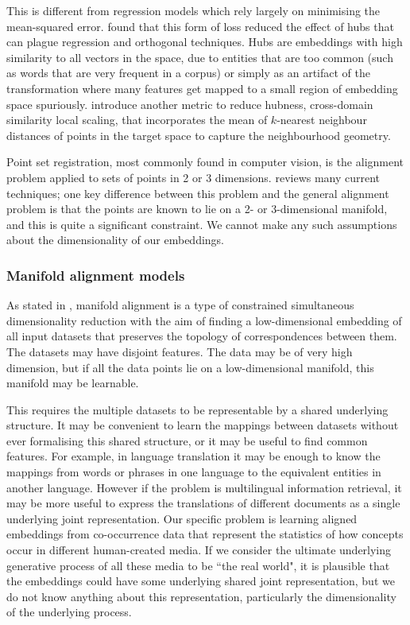 This is different from regression models which rely largely on minimising the mean-squared error. \cite{Hubness} found that this form of loss reduced the effect of hubs that can plague regression and orthogonal techniques. Hubs are embeddings with high similarity to all vectors in the space, due to entities that are too common (such as words that are very frequent in a corpus) or simply as an artifact of the transformation where many features get mapped to a small region of embedding space spuriously. \cite{ImprovingSupervisedBilingualMapping} introduce another metric to reduce hubness, cross-domain similarity local scaling, that incorporates the mean of $k$-nearest neighbour distances of points in the target space to capture the neighbourhood geometry. 

Point set registration, most commonly found in computer vision, is the alignment problem applied to sets of points in 2 or 3 dimensions. \cite{PointSetRegistrationReview} reviews many current techniques; one key difference between this problem and the general alignment problem is that the points are known to lie on a 2- or 3-dimensional manifold, and this is quite a significant constraint. We cannot make any such assumptions about the dimensionality of our embeddings. 

\subsubsection{Manifold alignment models}

As stated in \cite{ManifoldLearningTheoryAndApplications}, manifold alignment is a type of constrained simultaneous dimensionality reduction with the aim of finding a low-dimensional embedding of all input datasets that preserves the topology of correspondences between them. The datasets may have disjoint features. The data may be of very high dimension, but if all the data points lie on a low-dimensional manifold, this manifold may be learnable.  

This requires the multiple datasets to be representable by a shared underlying structure. It may be convenient to learn the mappings between datasets without ever formalising this shared structure, or it may be useful to find common features. For example, in language translation it may be enough to know the mappings from words or phrases in one language to the equivalent entities in another language. However if the problem is multilingual information retrieval, it may be more useful to express the translations of different documents as a single underlying joint representation. Our specific problem is learning aligned embeddings from co-occurrence data that represent the statistics of how concepts occur in different human-created media. If we consider the ultimate underlying generative process of all these media to be ``the real world", it is plausible that the embeddings could have some underlying shared joint representation, but we do not know anything about this representation, particularly the dimensionality of the underlying process. 

